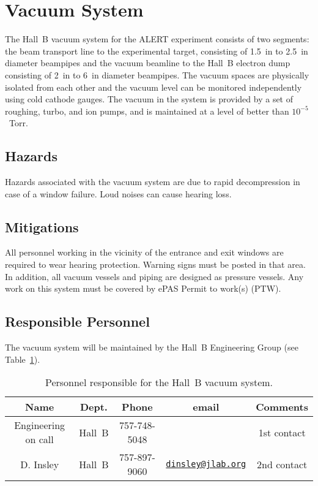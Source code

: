 \section{Vacuum System}

The Hall~B vacuum system for the ALERT experiment consists of two segments: the beam
transport line to the experimental target, consisting of 1.5~in to 2.5~in diameter
beampipes and the vacuum beamline to the Hall~B electron dump consisting of 
2~in to 6~in diameter beampipes. The vacuum spaces are physically isolated from each
other and the vacuum level can be monitored independently using cold cathode gauges. The
vacuum in the system is provided by a set of roughing, turbo, and ion pumps, and is
maintained at a level of better than $10^{-5}$~Torr. 

\subsection{Hazards} 

Hazards associated with the vacuum system are due to rapid decompression in case of a window 
failure. Loud noises can cause hearing loss. 

\subsection{Mitigations}

All personnel working in the vicinity of the entrance and exit windows are required to wear 
hearing protection. Warning signs must be posted in that area. In addition, all vacuum vessels 
and piping are designed as pressure vessels.  Any work on this system must be covered by ePAS
Permit to work(s) (PTW).

\subsection{Responsible Personnel}

The vacuum system will be maintained by the Hall~B Engineering Group (see
Table~\ref{tb:vacuum}).  

\begin{table}[!htb]
\centering
\begin{tabular}{|c|c|c|c|c|} \hline
Name&Dept.&Phone&email&Comments \\ \hline
Engineering on call & Hall~B& 757-748-5048&& 1st contact  \\ \hline
D. Insley & Hall~B  &757-897-9060&\href{mailto:dinsley@jlab.org}{\nolinkurl{dinsley@jlab.org}}  &2nd contact \\ \hline
 \end{tabular}
\caption{Personnel responsible for the Hall~B vacuum system.} 
\label{tb:vacuum}
\end{table}

